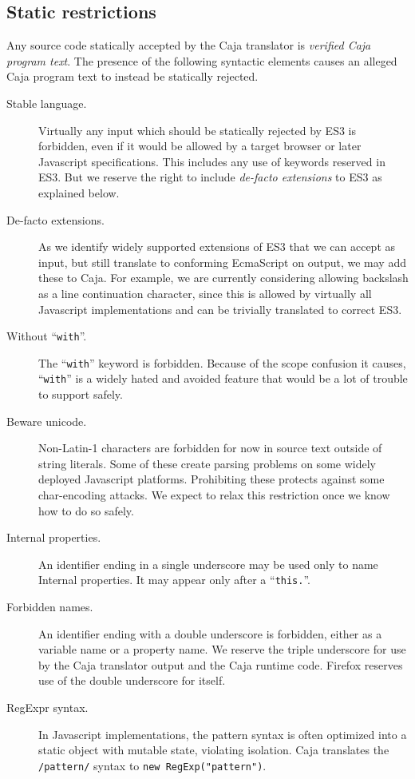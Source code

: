 \documentclass[letterpaper,twocolumn,10pt]{article}
\newcommand{\code}[1]{{\tt {#1}}}              %
\begin{document}
\subsection{Static restrictions}

Any source code statically accepted by the Caja translator is \emph{verified 
Caja program text}. The presence of the following syntactic elements causes 
an alleged Caja program text to instead be statically rejected.

\begin{description}

    \item[Stable language.] Virtually any input which should be statically 
    rejected by ES3 is forbidden, even if it would be allowed by a target 
    browser or later Javascript specifications. This includes any use of 
    keywords reserved in ES3. But we reserve the right to include 
    \emph{de-facto extensions} to ES3 as explained below.
    
    \item[De-facto extensions.] As we identify widely supported extensions of 
    ES3 that we can accept as input, but still translate to conforming 
    EcmaScript on output, we may add these to Caja. For example, we are 
    currently considering allowing backslash as a line continuation 
    character, since this is allowed by virtually all Javascript 
    implementations and can be trivially translated to correct ES3.

    \item[Without ``\code{with}''.] The ``\code{with}'' keyword is forbidden. 
    Because of the scope confusion it causes, ``\code{with}'' is a widely 
    hated and avoided feature that would be a lot of trouble to support 
    safely.

    \item[Beware unicode.] Non-Latin-1 characters are forbidden for now in 
    source text outside of string literals. Some of these create parsing 
    problems on some widely deployed Javascript platforms. Prohibiting these 
    protects against some char-encoding attacks. We expect to relax this 
    restriction once we know how to do so safely.

    \item[Internal properties.] An identifier ending in a single underscore 
    may be used only to name Internal properties. It may appear only after a 
    ``\code{this.}''.

    \item[Forbidden names.] An identifier ending with a double underscore is 
    forbidden, either as a variable name or a property name. We reserve the 
    triple underscore for use by the Caja translator output and the Caja 
    runtime code. Firefox reserves use of the double underscore for itself.
    
    \item[RegExpr syntax.] In Javascript implementations, the pattern syntax 
    is often optimized into a static object with mutable state, violating 
    isolation. Caja translates the \code{/pattern/} syntax to \code{new 
    RegExp("pattern")}.
        
\end{description}
\end{document}
